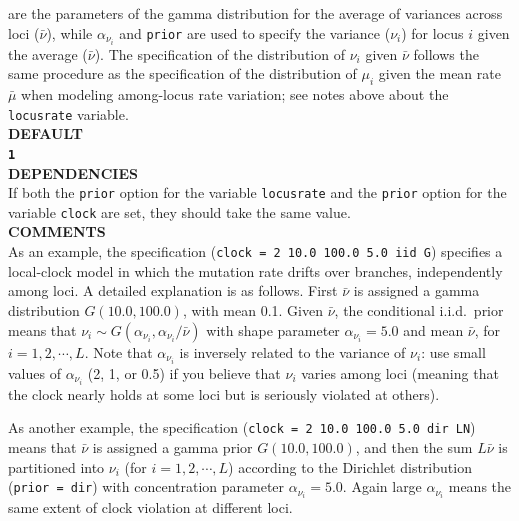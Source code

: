 \documentclass{book}
\numberwithin{equation}{section} \renewcommand{\baselinestretch}{0.55}
\begin{document}
are the parameters of the gamma distribution for the average of
variances across loci ($\bar\nu$), while $\alpha_{\nu_i}$ and
\texttt{prior} are used to specify the variance ($\nu_i$) for locus
$i$ given the average ($\bar\nu$).  The specification of the
distribution of $\nu_i$ given $\bar\nu$ follows the same procedure as
the specification of the distribution of $\mu_i$ given the mean rate
$\bar\mu$ when modeling among-locus rate variation; see notes above
about the \texttt{locusrate} variable.
\vspace{5pt}\\
\textbf{DEFAULT} \vspace{5pt}\\
\textbf{\texttt{1}} \vspace{5pt}\\
\textbf{DEPENDENCIES} \vspace{5pt}\\
If both the \texttt{prior} option for the variable \texttt{locusrate}
and the \texttt{prior} option
for the variable \texttt{clock} are set, they should take the same value.  \vspace{5pt} \\
\textbf{COMMENTS} \vspace{5pt}\\
As an example, the specification (\texttt{clock = 2 10.0 100.0 5.0 iid
  G}) specifies a local-clock model in which the mutation rate drifts
over branches, independently among loci. A detailed explanation is as
follows.  First $\bar\nu$ is assigned a gamma distribution
$G(10.0, 100.0)$, with mean 0.1.  Given $\bar\nu$, the conditional
i.i.d.\ prior means that
$\nu_i \sim G(\alpha_{\nu_i}, \alpha_{\nu_i}/\bar\nu)$ with shape
parameter $\alpha_{\nu_i} = 5.0$ and mean $\bar\nu$, for
$i = 1, 2, \cdots, L$.  Note that $\alpha_{\nu_i}$ is inversely
related to the variance of $\nu_i$: use small values of
$\alpha_{\nu_i}$ (2, 1, or 0.5) if you believe that $\nu_i$ varies
among loci (meaning that the clock nearly holds at some loci but is
seriously violated at others).

As another example, the specification (\texttt{clock = 2 10.0 100.0
  5.0 dir LN}) means that $\bar\nu$ is assigned a gamma prior
$G(10.0, 100.0)$, and then the sum $L\bar\nu$ is partitioned into
$\nu_i$ (for $i = 1, 2, \cdots, L$) according to the Dirichlet
distribution (\texttt{prior = dir}) with concentration parameter
$\alpha_{\nu_i} = 5.0$.  Again large $\alpha_{\nu_i}$ means the same
extent of clock violation at different loci.
\end{document}
